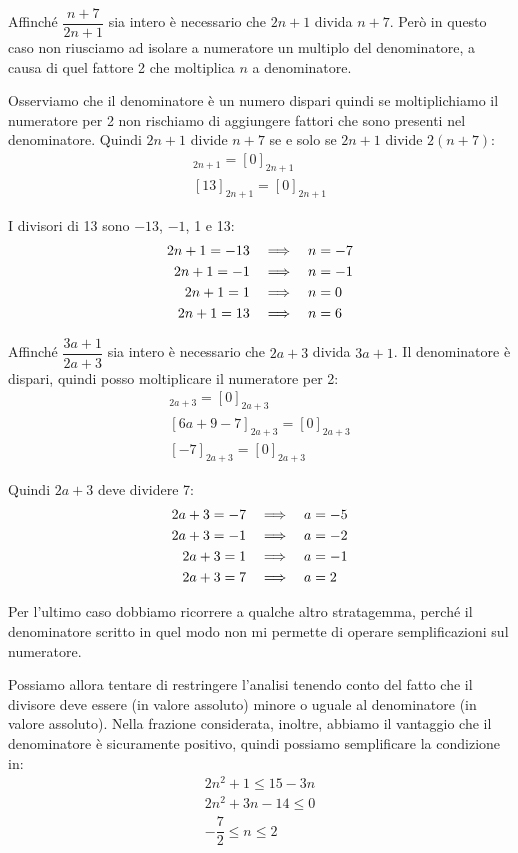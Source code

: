 \begin{soluzione}
    Affinché $\dfrac{n + 7}{2n + 1}$ sia intero è necessario che $2n+1$ divida $n+7$.
    Però in questo caso non riusciamo ad isolare a numeratore un multiplo del denominatore, a causa di quel fattore 2
    che moltiplica $n$ a denominatore.

    Osserviamo che il denominatore è un numero dispari quindi se moltiplichiamo il numeratore per 2 non rischiamo
    di aggiungere fattori che sono presenti nel denominatore.
    Quindi $2n+1$ divide $n+7$ se e solo se $2n+1$ divide $2(n+7)$:
    \begin{gather*}
        [2n +14]_{2n+1} = [0]_{2n + 1} \\
        [13]_{2n + 1} = [0]_{2n + 1}
    \end{gather*}

    I divisori di 13 sono $-13$, $-1$, 1 e 13:
    \begin{align*}
        2n + 1 = -13 & \quad\Longrightarrow\quad  n = -7 \\
        2n + 1 = -1 & \quad\Longrightarrow\quad  n = -1 \\
        2n + 1 = 1 & \quad\Longrightarrow\quad  n = 0 \\
        2n + 1 = 13 & \quad\Longrightarrow\quad  n = 6
    \end{align*}

    Affinché $\dfrac{3a + 1}{2a + 3}$ sia intero è necessario che $2a+3$ divida $3a+1$.
    Il denominatore è dispari, quindi posso moltiplicare il numeratore per 2:
    \begin{gather*}
        [6a + 2]_{2a + 3} = [0]_{2a + 3} \\
        [6a + 9 - 7]_{2a + 3} = [0]_{2a+3} \\
        [-7]_{2a + 3} = [0]_{2a+3}
    \end{gather*}

    Quindi $2a + 3$ deve dividere 7:
    \begin{align*}
        2a + 3 = -7 & \quad\Longrightarrow\quad  a = -5 \\
        2a + 3 = -1 & \quad\Longrightarrow\quad  a = -2 \\
        2a + 3 = 1 & \quad\Longrightarrow\quad  a = -1 \\
        2a + 3 = 7 & \quad\Longrightarrow\quad  a = 2
    \end{align*}

    Per l'ultimo caso dobbiamo ricorrere a qualche altro stratagemma, perché il denominatore scritto in quel modo
    non mi permette di operare semplificazioni sul numeratore.

    Possiamo allora tentare di restringere l'analisi tenendo conto del fatto che il divisore deve essere (in valore
    assoluto) minore o uguale al denominatore (in valore assoluto).
    Nella frazione considerata, inoltre, abbiamo il vantaggio che il denominatore è sicuramente positivo, quindi
    possiamo semplificare la condizione in:
    \begin{gather*}
        2n^2 + 1 \le 15 - 3n \\
        2n^2 + 3n - 14 \le 0 \\
        -\dfrac{7}{2} \le n \le 2
    \end{gather*}


\end{soluzione}
